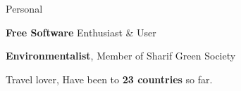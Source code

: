 
        \begin{xSection}{Personal}

            \medskip
            \small
            \begin{myitemize}
                \item{\textbf{Free Software} Enthusiast \& User} 
                \item{\textbf{Environmentalist}, Member of Sharif Green Society}
                \item{Travel lover, Have been to \textbf{23 countries} so far.}
            \end{myitemize}

        \end{xSection}
